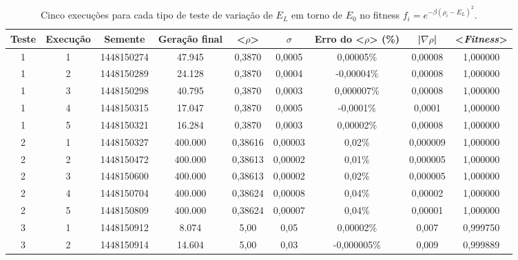 	\begin{landscape}
\begin{center}	
\begin{table}[htbp]
\caption{Cinco execuções para cada tipo de teste de variação de $E_L$ em torno de $E_0$ no fitness $f_i = e^{-\beta(\rho_i - E_L)^2}$.}
\label{tab:VariandoELCincoExecucoes}
\centering
\begin{tabular}{ccccccccc}
\hline \hline
\textbf{Teste} & \textbf{Execução} & \textbf{Semente} & \textbf{Geração final} & \textbf{<$\rho$>} & \textbf{$\sigma$} & \textbf{Erro do <$\rho$> (\%)} & \textbf{|$\nabla \rho$|} & \textbf{<\emph{Fitness}>} \\
\hline \hline
         1 &          1 & 1448150274 &     47.945 &     0,3870 &     0,0005 &  0,00005\% &    0,00008 &   1,000000 \\
\hline
         1 &          2 & 1448150289 &     24.128 &     0,3870 &     0,0004 & -0,00004\% &    0,00008 &   1,000000 \\
\hline
         1 &          3 & 1448150298 &     40.795 &     0,3870 &     0,0003 & 0,000007\% &    0,00008 &   1,000000 \\
\hline
         1 &          4 & 1448150315 &     17.047 &     0,3870 &     0,0005 &  -0,0001\% &     0,0001 &   1,000000 \\
\hline
         1 &          5 & 1448150321 &     16.284 &     0,3870 &     0,0003 &  0,00002\% &    0,00008 &   1,000000 \\
\hline \hline
         2 &          1 & 1448150327 &    400.000 &    0,38616 &    0,00003 &     0,02\% &   0,000009 &   1,000000 \\
\hline
         2 &          2 & 1448150472 &    400.000 &    0,38613 &    0,00002 &     0,01\% &   0,000005 &   1,000000 \\
\hline
         2 &          3 & 1448150600 &    400.000 &    0,38613 &    0,00002 &     0,02\% &   0,000005 &   1,000000 \\
\hline
         2 &          4 & 1448150704 &    400.000 &    0,38624 &    0,00008 &     0,04\% &    0,00002 &   1,000000 \\
\hline
         2 &          5 & 1448150809 &    400.000 &    0,38624 &    0,00007 &     0,04\% &    0,00001 &   1,000000 \\
\hline \hline
         3 &          1 & 1448150912 &      8.074 &       5,00 &       0,05 &  0,00002\% &      0,007 &   0,999750 \\
\hline
         3 &          2 & 1448150914 &     14.604 &       5,00 &       0,03 & -0,000005\% &      0,009 &   0,999889 \\

\end{tabular}
\end{table}
\end{center}
\end{landscape}
